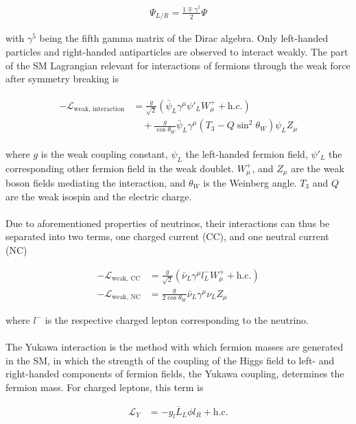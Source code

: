 \documentclass[a4paper,12pt,numbered]{article}
\begin{document}
\begin{align}
\Psi_{L/R}=\frac{1\mp \gamma^5}{2}\Psi
\end{align}

with $\gamma^5$ being the fifth gamma matrix of the Dirac algebra. Only left-handed particles and right-handed antiparticles are observed to interact weakly. The part of the SM Lagrangian relevant for interactions of fermions through the weak force after symmetry breaking is

\begin{align}
\begin{split}
-\mathcal{L}_{\text{weak, interaction}} &= 
\frac{g}{\sqrt{2}} \left( \bar{\psi}_L \gamma^\mu \psi'_L W^+_\mu + \text{h.c.} \right) \\
&\quad + \frac{g}{\cos \theta_W} \bar{\psi}_L \gamma^\mu 
\left( T_3 - Q \sin^2 \theta_W \right) \psi_L Z_\mu 
\end{split}
\end{align}

where $g$ is the weak coupling constant, $\psi_L$ the left-handed fermion field, $\psi'_L$ the corresponding other fermion field in the weak doublet. $W^+_\mu$, and $Z_\mu$ are the weak boson fields mediating the interaction, and $\theta_W$ is the Weinberg angle. $T_3$ and $Q$ are the weak isospin and the electric charge.
\\ \\
Due to aforementioned properties of neutrinos, their interactions can thus be separated into two terms, one charged current (CC), and one neutral current (NC)

\begin{align}
-\mathcal{L}_{\text{weak, CC}} &= 
\frac{g}{\sqrt{2}} \left( \bar{\nu}_L \gamma^\mu l^-_L W^+_\mu + \text{h.c.} \right) \\
-\mathcal{L}_{\text{weak, NC}} &= \frac{g}{2\cos \theta_W} \bar{\nu}_L \gamma^\mu \nu_L Z_\mu
\end{align}

where $l^-$ is the respective charged lepton corresponding to the neutrino. 
\\ \\
The Yukawa interaction is the method with which fermion masses are generated in the SM, in which the strength of the coupling of the Higgs field to left- and right-handed components of fermion fields, the Yukawa coupling, determines the fermion mass. For charged leptons, this term is

\begin{align}
\mathcal{L}_Y &= - y_l \bar{L}_L \phi l_R + \text{h.c.} 
\end{align}
\end{document}
